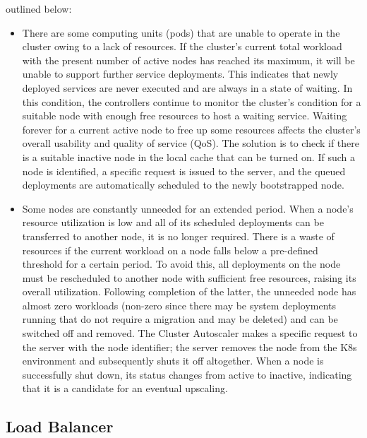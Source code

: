 outlined below:
\begin{itemize}
  \item There are some computing units (pods) that are unable to operate in the cluster
    owing to a lack of resources.
    \newline
    If the cluster's current total workload with the present number of active
    nodes has reached its maximum, it will be unable to support further service deployments.
    This indicates that newly deployed services are never executed and are
    always in a state of waiting. In this condition, the controllers continue to
    monitor the cluster's condition for a suitable node with enough free
    resources to host a waiting service. Waiting forever for a current active node
    to free up some resources affects the cluster's overall usability and quality
    of service (QoS). The solution is to check if there is a suitable inactive
    node in the local cache that can be turned on. If such a node is identified,
    a specific request is issued to the server, and the queued deployments are automatically
    scheduled to the newly bootstrapped node.

  \item Some nodes are constantly unneeded for an extended period. When a node's
    resource utilization is low and all of its scheduled deployments can be
    transferred to another node, it is no longer required.
    \newline
    There is a waste of resources if the current workload on a node falls below
    a pre-defined threshold for a certain period. To avoid this, all deployments
    on the node must be rescheduled to another node with sufficient free
    resources, raising its overall utilization. Following completion of the
    latter, the unneeded node has almost zero workloads (non-zero since there
    may be system deployments running that do not require a migration and may be
    deleted) and can be switched off and removed. The Cluster Autoscaler makes a
    specific request to the server with the node identifier; the server removes the
    node from the K8s environment and subsequently shuts it off altogether. When
    a node is successfully shut down, its status changes from active to inactive,
    indicating that it is a candidate for an eventual upscaling.
\end{itemize}

\subsection{Load Balancer}
\label{subsec:architecture_components_load_balancer}

